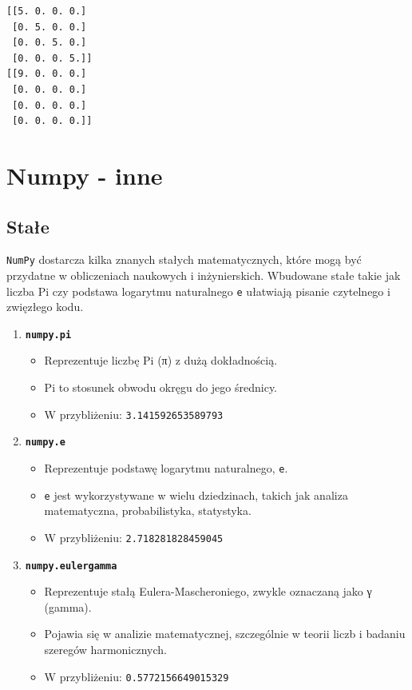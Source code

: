 \documentclass[
  polish,
  letterpaper,
  DIV=11,
  numbers=noendperiod]{scrreprt}
\providecommand{\tightlist}{%
  \setlength{\itemsep}{0pt}\setlength{\parskip}{0pt}}
\begin{document}
\begin{verbatim}
[[5. 0. 0. 0.]
 [0. 5. 0. 0.]
 [0. 0. 5. 0.]
 [0. 0. 0. 5.]]
[[9. 0. 0. 0.]
 [0. 0. 0. 0.]
 [0. 0. 0. 0.]
 [0. 0. 0. 0.]]
\end{verbatim}

\chapter{Numpy - inne}\label{numpy---inne}

\section{Stałe}\label{staux142e}

\texttt{NumPy} dostarcza kilka znanych stałych matematycznych, które
mogą być przydatne w obliczeniach naukowych i inżynierskich. Wbudowane
stałe takie jak liczba Pi czy podstawa logarytmu naturalnego \texttt{e}
ułatwiają pisanie czytelnego i zwięzłego kodu.

\begin{enumerate}
\def\labelenumi{\arabic{enumi}.}
\tightlist
\item
  \textbf{\texttt{numpy.pi}}

  \begin{itemize}
  \tightlist
  \item
    Reprezentuje liczbę Pi (π) z dużą dokładnością.\\
  \item
    Pi to stosunek obwodu okręgu do jego średnicy.\\
  \item
    W przybliżeniu: \texttt{3.141592653589793}
  \end{itemize}
\item
  \textbf{\texttt{numpy.e}}

  \begin{itemize}
  \tightlist
  \item
    Reprezentuje podstawę logarytmu naturalnego, \texttt{e}.\\
  \item
    \texttt{e} jest wykorzystywane w wielu dziedzinach, takich jak
    analiza matematyczna, probabilistyka, statystyka.\\
  \item
    W przybliżeniu: \texttt{2.718281828459045}
  \end{itemize}
\item
  \textbf{\texttt{numpy.eulergamma}}

  \begin{itemize}
  \tightlist
  \item
    Reprezentuje stałą Eulera-Mascheroniego, zwykle oznaczaną jako γ
    (gamma).
  \item
    Pojawia się w analizie matematycznej, szczególnie w teorii liczb i
    badaniu szeregów harmonicznych.
  \item
    W przybliżeniu: \texttt{0.5772156649015329}
  \end{itemize}
\end{enumerate}
\end{document}
